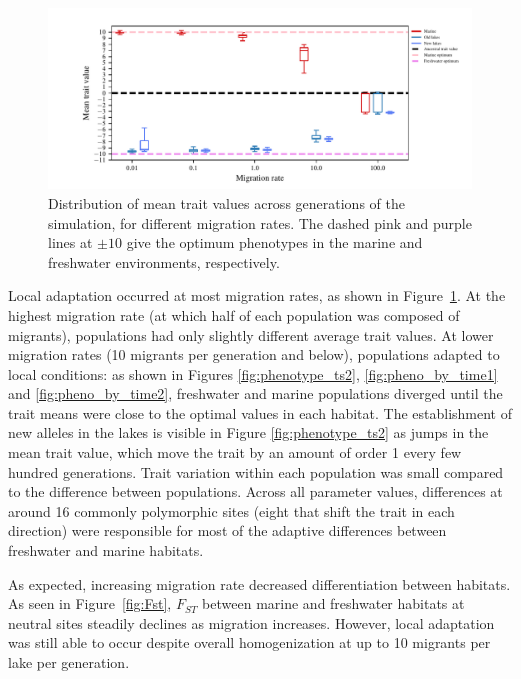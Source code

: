 \documentclass{article}
\begin{document}
\begin{figure}
	\begin{center}
  		\includegraphics{Final_Plots/Pheno_Dist.pdf}
  		\caption{
            Distribution of mean trait values across generations of the simulation,
            for different migration rates.
            The dashed pink and purple lines at $\pm 10$ give the optimum phenotypes
            in the marine and freshwater environments, respectively.
		}
  		\label{fig:MeanPhenotype}
	\end{center}
\end{figure}

Local adaptation occurred at most migration rates,
as shown in Figure~\ref{fig:MeanPhenotype}.
At the highest migration rate (at which half of each population was composed of migrants),
populations had only slightly different average trait values.
At lower migration rates (10 migrants per generation and below),
populations adapted to local conditions:
as shown in Figures \ref{fig:phenotype_ts2},
\ref{fig:pheno_by_time1} and \ref{fig:pheno_by_time2},
freshwater and marine populations diverged
until the trait means were close to the optimal values in each habitat. 
The establishment of new alleles in the lakes is visible in Figure \ref{fig:phenotype_ts2}
as jumps in the mean trait value,
which move the trait by an amount of order 1 every few hundred generations.
Trait variation within each population was small compared to the difference between populations.
Across all parameter values, differences at around 16 commonly polymorphic sites 
(eight that shift the trait in each direction)
were responsible for most of the adaptive differences between freshwater and marine habitats.

As expected, increasing migration rate decreased differentiation between habitats. 
As seen in Figure~\ref{fig:Fst}, 
$F_{ST}$ between marine and freshwater habitats 
at neutral sites steadily declines as migration increases. 
However, local adaptation was still able to occur despite overall homogenization 
at up to 10 migrants per lake per generation.
\end{document}
